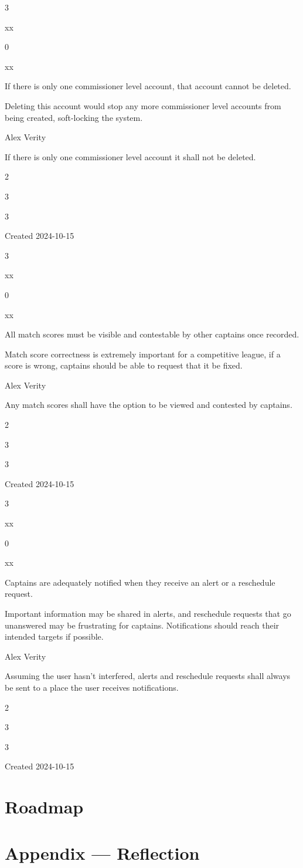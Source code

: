 \documentclass{article}
\newenvironment{myreq}[1]{%
\setlist[description]{font=\normalfont\color{darkgray}}%
\begin{tcolorbox}[colframe=black,colback=white, sharp corners, boxrule=1pt]%
\bfseries\color{blue}%
\begin{description}#1}%
{\end{description}\end{tcolorbox}}
\newcommand{\threeinline}[3]{\begin{multicols}{3}#1 #2 #3\end{multicols}}
\newcommand{\twoinline}[2]{\begin{multicols}{2}#1 #2\end{multicols}}
\newcommand{\reqno}{\item[Requirement \#:]}
\newcommand{\reqtype}{\item[Requirement Type:]}
\newcommand{\reqevent}{\item[Event/BUC/PUC \#:]}
\newcommand{\reqdesc}{\item[Description:]}
\newcommand{\reqrat}{\item[Rationale:]}
\newcommand{\reqorig}{\item[Originator:]}
\newcommand{\reqfit}{\item[Fit Criterion:]}
\newcommand{\reqsatis}{\item[Customer Satisfaction:]}
\newcommand{\reqdissat}{\item[Customer Dissatisfaction:]}
\newcommand{\reqhist}{\item[History:]}
\begin{document}
\begin{myreq}
    \threeinline
      {\reqno xx}
      {\reqtype 0}
      {\reqevent xx}
    \reqdesc If there is only one commissioner level account, that account
    cannot be deleted.
    \reqrat Deleting this account would stop any more commissioner level
    accounts from being created, soft-locking the system.
    \reqorig Alex Verity
    \reqfit If there is only one commissioner level account it shall not be
    deleted.
    \twoinline
      {\reqsatis 3}
      {\reqdissat 3}
    \reqhist Created 2024-10-15
\end{myreq}

\begin{myreq}
    \threeinline
      {\reqno xx}
      {\reqtype 0}
      {\reqevent xx}
    \reqdesc All match scores must be visible and contestable by other
    captains once recorded.
    \reqrat Match score correctness is extremely important for a competitive
    league, if a score is wrong, captains should be able to request that it be
    fixed.
    \reqorig Alex Verity
    \reqfit Any match scores shall have the option to be viewed and contested
    by captains.
    \twoinline
      {\reqsatis 3}
      {\reqdissat 3}
    \reqhist Created 2024-10-15
\end{myreq}

\begin{myreq}
  \threeinline
    {\reqno xx}
    {\reqtype 0}
    {\reqevent xx}
  \reqdesc Captains are adequately notified when they receive an alert or a
  reschedule request.
  \reqrat Important information may be shared in alerts, and reschedule
  requests that go unanswered may be frustrating for captains. Notifications
  should reach their intended targets if possible.
  \reqorig Alex Verity
  \reqfit Assuming the user hasn't interfered, alerts and reschedule requests
  shall always be sent to a place the user receives notifications.
  \twoinline
    {\reqsatis 3}
    {\reqdissat 3}
  \reqhist Created 2024-10-15
\end{myreq}

\section{Roadmap}


\newpage{}

\section*{Appendix --- Reflection}
\end{document}
